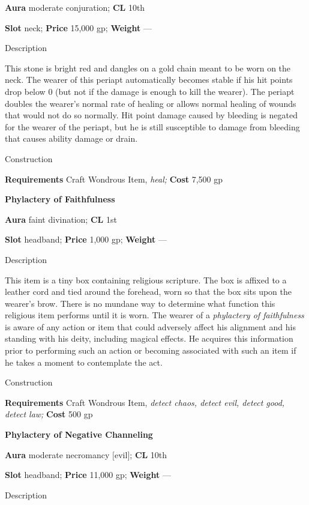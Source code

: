 \textbf{Aura} moderate conjuration;\textbf{ CL }10th
				
\textbf{Slot} neck; \textbf{Price} 15,000 gp; \textbf{Weight }---
				
Description
				
This stone is bright red and dangles on a gold chain meant to be worn on the neck. The wearer of this periapt automatically becomes stable if his hit points drop below 0 (but not if the damage is enough to kill the wearer). The periapt doubles the wearer's normal rate of healing or allows normal healing of wounds that would not do so normally. Hit point damage caused by bleeding is negated for the wearer of the periapt, but he is still susceptible to damage from bleeding that causes ability damage or drain. 
				
Construction
				
\textbf{Requirements} Craft Wondrous Item,\textit{ heal;}\textbf{ Cost }7,500 gp
				
\textbf{Phylactery of Faithfulness}
				
\textbf{Aura} faint divination;\textbf{ CL }1st
				
\textbf{Slot} headband; \textbf{Price} 1,000 gp; \textbf{Weight }---
				
Description
				
This item is a tiny box containing religious scripture. The box is affixed to a leather cord and tied around the forehead, worn so that the box sits upon the wearer's brow. There is no mundane way to determine what function this religious item performs until it is worn. The wearer of a \textit{phylactery of faithfulness} is aware of any action or item that could adversely affect his alignment and his standing with his deity, including magical effects. He acquires this information prior to performing such an action or becoming associated with such an item if he takes a moment to contemplate the act. 
				
Construction
				
\textbf{Requirements} Craft Wondrous Item, \textit{detect chaos, detect evil, detect good, detect law;}\textbf{ Cost }500 gp
				
\textbf{Phylactery of Negative Channeling}
				
\textbf{Aura} moderate necromancy \mbox{$[$}evil\mbox{$]$}; \textbf{CL} 10th
				
\textbf{Slot }headband; \textbf{Price} 11,000 gp; \textbf{Weight} ---
				
Description
				
